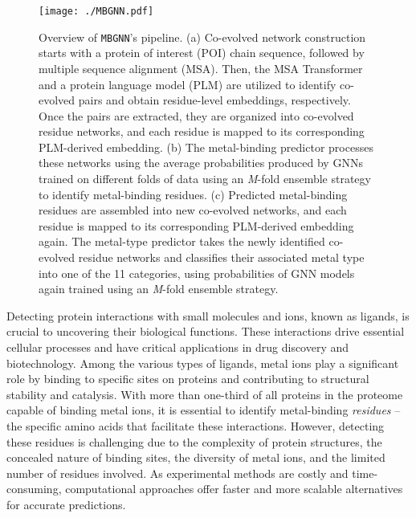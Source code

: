 \documentclass[letterpaper, 10 pt, conference]{ieeeconf}
\begin{document}
\begin{figure*}[t]
    \centering
    \texttt{[image: ./MBGNN.pdf]}
    \caption{Overview of \texttt{MBGNN}'s pipeline.
    (a) Co-evolved network construction starts with a protein of interest (POI) chain sequence, followed by multiple sequence alignment (MSA). Then, the MSA Transformer and a protein language model (PLM) are utilized to identify co-evolved pairs and obtain residue-level embeddings, respectively. Once the pairs are extracted, they are organized into co-evolved residue networks, and each residue is mapped to its corresponding PLM-derived embedding. 
    (b) The metal-binding predictor processes these networks using the average probabilities produced by GNNs trained on different folds of data using an \textit{M}-fold ensemble strategy to identify metal-binding residues.
    (c) Predicted metal-binding residues are assembled into new co-evolved networks, and each residue is mapped to its corresponding PLM-derived embedding again. The metal-type predictor takes the newly identified co-evolved residue networks and classifies their associated metal type into one of the 11 categories, using probabilities of GNN models again trained using an \textit{M}-fold ensemble strategy.}
    \label{fig:visualabstract}
\vspace{-5pt}
\end{figure*}


Detecting protein interactions with small molecules and ions, known as ligands, is crucial to uncovering their biological functions. These interactions drive essential cellular processes \cite{p1,p2,p3,gladyshev2013comparative} and have critical applications in drug discovery and biotechnology. Among the various types of ligands, metal ions play a significant role by binding to specific sites on proteins and contributing to structural stability and catalysis. With more than one-third of all proteins in the proteome capable of binding metal ions\cite{cheng2023co}, it is essential to identify metal-binding \textit{residues} -- the specific amino acids that facilitate these interactions. However, detecting these residues is challenging due to the complexity of protein structures, the concealed nature of binding sites, the diversity of metal ions, and the limited number of residues involved. As experimental methods are costly and time-consuming, computational approaches offer faster and more scalable alternatives for accurate predictions.
\end{document}
